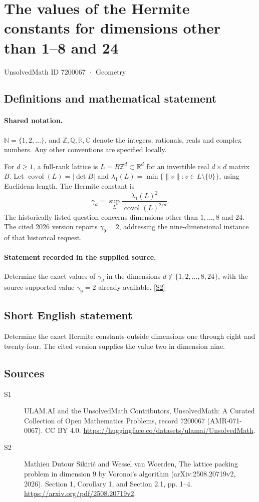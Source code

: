 \documentclass[11pt]{article}
\newcommand{\sref}[2]{\hyperlink{source:#1:#2}{[S#2]}}
\begin{document}
\setcounter{section}{7200066}
\section{The values of the Hermite constants for dimensions other than 1–8 and 24}\label{7200067}
{\small\sffamily UnsolvedMath ID 7200067 · Geometry}
\subsection{Definitions and mathematical statement}

\paragraph{Shared notation.}$\mathbb N=\{1,2,\ldots\}$, and $\mathbb Z,\mathbb Q,\mathbb R,\mathbb C$ denote the integers, rationals, reals and complex numbers. Any other conventions are specified locally.


For $d\geq1$, a full-rank lattice is $L=B\mathbb Z^d\subset\mathbb R^d$ for an invertible real $d\times d$ matrix $B$. Let $\operatorname{covol}(L)=|\det B|$ and $\lambda_1(L)=\min\{\|v\|:v\in L\setminus\{0\}\}$, using Euclidean length. The Hermite constant is
\[\gamma_d=\sup_L\frac{\lambda_1(L)^2}{\operatorname{covol}(L)^{2/d}}.\]
The historically listed question concerns dimensions other than $1,\ldots,8$ and $24$. The cited 2026 version reports $\gamma_9=2$, addressing the nine-dimensional instance of that historical request.
\paragraph{Statement recorded in the supplied source.}
Determine the exact values of $\gamma_d$ in the dimensions $d\notin\{1,2,\ldots,8,24\}$, with the source-supported value $\gamma_9=2$ already available. \sref{7200067}{2}
\subsection{Short English statement}
Determine the exact Hermite constants outside dimensions one through eight and twenty-four. The cited version supplies the value two in dimension nine.
\subsection{Sources}
\begin{description}
\item[\hypertarget{source:7200067:1}{S1}] ULAM.AI and the UnsolvedMath Contributors, UnsolvedMath: A Curated Collection of Open Mathematics Problems, record 7200067 (AMR-071-0067). CC BY 4.0. \url{https://huggingface.co/datasets/ulamai/UnsolvedMath}.
\item[\hypertarget{source:7200067:2}{S2}] Mathieu Dutour Sikirić and Wessel van Woerden, The lattice packing problem in dimension 9 by Voronoi’s algorithm (arXiv:2508.20719v2, 2026). Section 1, Corollary 1, and Section 2.1, pp. 1–4. \url{https://arxiv.org/pdf/2508.20719v2}.
\end{description}
\label{end:7200067}
\end{document}
